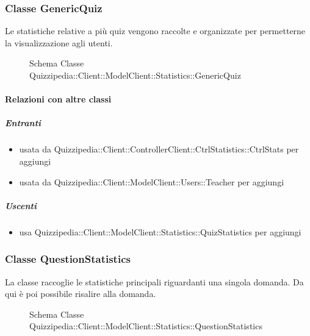 \subsubsection{Classe GenericQuiz}
Le statistiche relative a più quiz vengono raccolte e organizzate per permetterne la visualizzazione agli utenti.
\begin{figure}[H]
\centering
\noindent{}
\caption[Schema Classe GenericQuiz]{Schema Classe Quizzipedia::Client::ModelClient::Statistics::GenericQuiz}
\end{figure}
\paragraph{Relazioni con altre classi}
\subparagraph{Entranti}
\begin{itemize}
\item usata da Quizzipedia::Client::ControllerClient::CtrlStatistics::CtrlStats per aggiungi
\item usata da Quizzipedia::Client::ModelClient::Users::Teacher per aggiungi
\end{itemize}
\subparagraph{Uscenti}
\begin{itemize}
\item usa Quizzipedia::Client::ModelClient::Statistics::QuizStatistics per aggiungi
\end{itemize}
\subsubsection{Classe QuestionStatistics}
La classe raccoglie le statistiche principali riguardanti una singola domanda. Da qui è poi possibile risalire alla domanda.
\begin{figure}[H]
\centering
\noindent{}
\caption[Schema Classe QuestionStatistics]{Schema Classe Quizzipedia::Client::ModelClient::Statistics::QuestionStatistics}
\end{figure}
